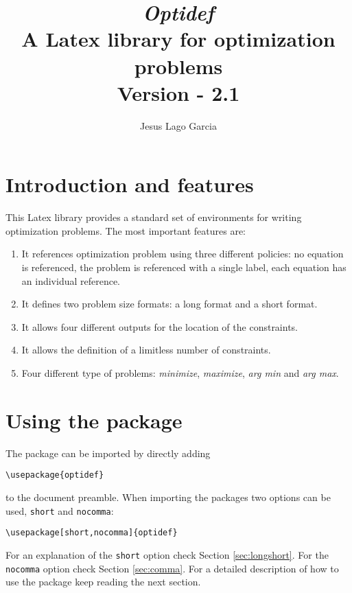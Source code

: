 \documentclass[a4paper]{article}
\title{\textit{\textbf{Optidef}} \\ A Latex library for optimization problems\\ \textnormal{Version - 2.1}}
\author{Jesus Lago Garcia}
\begin{document}
\maketitle

\newpage

\tableofcontents

\newpage

\section{Introduction and features}

This Latex library provides a standard set of environments for writing optimization problems. The most important features are:
\begin{enumerate}
\item It references optimization problem using three different policies: no equation is referenced, the problem is referenced with a single label, each equation has an individual reference.
\item It defines two problem size formats: a long format and a short format.
\item It allows four different outputs for the location of the constraints.
\item It allows the definition of a limitless number of constraints.
\item Four different type of problems: \textit{minimize}, \textit{maximize}, \textit{arg min} and \textit{arg max}.
\end{enumerate}

\section{Using the package}
The package can be imported by directly adding
\begin{lstlisting}
\usepackage{optidef}
\end{lstlisting}
to the document preamble. When importing the packages two options can be used, \verb|short| and \verb|nocomma|:

\begin{lstlisting}
\usepackage[short,nocomma]{optidef}
\end{lstlisting}

For an explanation of the \verb|short| option check Section \ref{sec:longshort}. For the \verb|nocomma| option check Section \ref{sec:comma}. For a detailed description of how to use the package keep reading the next section.
\end{document}
